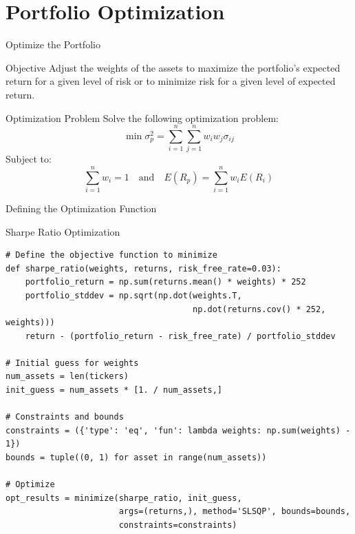 \documentclass{beamer}
\begin{document}
\section{Portfolio Optimization}
\begin{frame}{Optimize the Portfolio}
    \begin{block}{Objective}
        Adjust the weights of the assets to maximize the portfolio's expected return for a given level of risk or to minimize risk for a given level of expected return.
    \end{block}
    \begin{block}{Optimization Problem}
        Solve the following optimization problem:
        \begin{equation*}
            \min \sigma_p^2 = \sum_{i=1}^{n} \sum_{j=1}^{n} w_i w_j \sigma_{ij}
        \end{equation*}
        Subject to:
        \begin{equation*}
            \sum_{i=1}^{n} w_i = 1 \quad \text{and} \quad E(R_p) = \sum_{i=1}^{n} w_i E(R_i)
        \end{equation*}
    \end{block}
\end{frame}

\begin{frame}[fragile]{Defining the Optimization Function}
    \begin{block}{Sharpe Ratio Optimization}
        \scriptsize
        \begin{verbatim}
# Define the objective function to minimize
def sharpe_ratio(weights, returns, risk_free_rate=0.03):
    portfolio_return = np.sum(returns.mean() * weights) * 252
    portfolio_stddev = np.sqrt(np.dot(weights.T, 
                                      np.dot(returns.cov() * 252, weights)))
    return - (portfolio_return - risk_free_rate) / portfolio_stddev

# Initial guess for weights
num_assets = len(tickers)
init_guess = num_assets * [1. / num_assets,]

# Constraints and bounds
constraints = ({'type': 'eq', 'fun': lambda weights: np.sum(weights) - 1})
bounds = tuple((0, 1) for asset in range(num_assets))

# Optimize
opt_results = minimize(sharpe_ratio, init_guess, 
                       args=(returns,), method='SLSQP', bounds=bounds, 
                       constraints=constraints)
        \end{verbatim}
    \end{block}
\end{frame}
\end{document}
